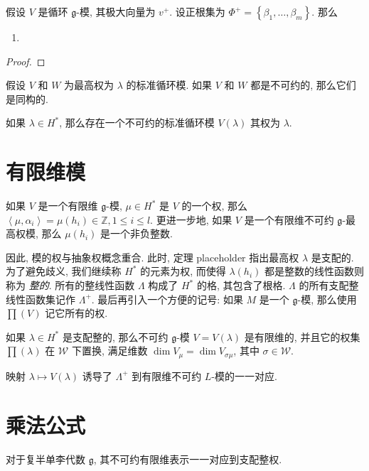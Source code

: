 \begin{theorem}
  假设 \( V \) 是循环 \( \mathfrak{g} \)-模, 其极大向量为 \( v^+ \). 设正根集为
  \( \Phi^+ = \left\lbrace \beta_1, \ldots, \beta_m \right\rbrace \). 那么
  \begin{enumerate}
    \item 
  \end{enumerate}
\end{theorem}
\begin{proof}
  
\end{proof}

\begin{theorem}
假设 \( V \) 和 \( W \) 为最高权为 \( \lambda \) 的标准循环模. 如果 \( V \) 和
\( W \) 都是不可约的, 那么它们是同构的.
\end{theorem}

\begin{theorem}
  如果 \( \lambda \in H^* \), 那么存在一个不可约的标准循环模 \( V(\lambda) \)
  其权为 \( \lambda \).
\end{theorem}

\section{有限维模}

\begin{theorem}
  如果 \( V \) 是一个有限维 \( \mathfrak{g} \)-模, \( \mu \in H^* \) 是 \( V \)
  的一个权, 那么 \( \left\langle \mu, \alpha_i \right\rangle = \mu(h_i) \in
  \mathbb{Z}, 1 \leq i \leq l \).
  更进一步地, 如果 \( V \) 是一个有限维不可约 \( \mathfrak{g} \)-最高权模, 那么
  \( \mu(h_i) \) 是一个非负整数.
\end{theorem}


因此, 模的权与抽象权概念重合. 此时,
定理 placeholder 指出最高权 \( \lambda \) 是支配的. 为了避免歧义, 我们继续称 \( H^* \)
的元素为权, 而使得 \( \lambda(h_i) \) 都是整数的线性函数则称为 \emph{整的}.
所有的整线性函数 \( \Lambda \) 构成了 \( H^* \) 的格, 其包含了根格. \( \Lambda \)
的所有支配整线性函数集记作 \( \Lambda^+ \). 最后再引入一个方便的记号: 如果 \( M \)
是一个 \( \mathfrak{g} \)-模, 那么使用 \( \prod (V) \) 记它所有的权.

\begin{theorem}
  如果 \( \lambda \in H^* \) 是支配整的, 那么不可约 \( \mathfrak{g} \)-模 \( V =
  V(\lambda)\) 是有限维的, 并且它的权集 \( \prod(\lambda) \) 在 \( \mathscr{W}
  \) 下置换, 满足维数 \( \operatorname{dim} V_{\mu} = \operatorname{dim}
  V_{\sigma \mu} \), 其中 \( \sigma \in \mathscr{W} \).
\end{theorem}

\begin{corollary}
  映射 \( \lambda \mapsto V(\lambda) \) 诱导了 \( \Lambda^+ \) 到有限维不可约 \(
  L \)-模的一一对应.
\end{corollary}

\section{乘法公式}

对于复半单李代数 \( \mathfrak{g} \), 其不可约有限维表示一一对应到支配整权.

